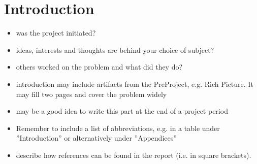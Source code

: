 \chapter{Introduction}

\begin{itemize}
\item was the project initiated?
\item ideas, interests and thoughts are behind your choice of subject?
\item others worked on the problem and what did they do?
\item introduction may include artifacts from the PreProject, e.g. Rich Picture. It may fill two pages and cover the problem widely
\item may be a good idea to write this part at the end of a project period
\item Remember to include a list of abbreviations, e.g. in a table under  ”Introduction” or alternatively under ”Appendices”
\item describe how references can be found in the report (i.e. in square brackets).
\end{itemize}

\tableofcontents